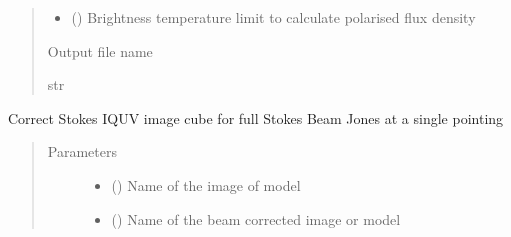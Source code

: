 \documentclass[letterpaper,10pt,english]{sphinxmanual}
\begin{document}
\begin{fulllineitems}
\begin{fulllineitems}
\begin{quote}
\begin{description}
\begin{itemize}
\item {} 
\sphinxAtStartPar
{} () \textendash{} Brightness temperature limit to calculate polarised flux density

\end{itemize}

\item[{Returns}] \leavevmode
\sphinxAtStartPar
Output file name

\item[{Return type}] \leavevmode
\sphinxAtStartPar
str

\end{description}\end{quote}

\end{fulllineitems}


\begin{fulllineitems}
\label{\detokenize{paircars:paircars.fullpol_selfcal_LTS.PolSelfcal.correct_for_single_beam_jones}}
\sphinxAtStartPar
Correct Stokes IQUV image cube for full Stokes Beam Jones at a single pointing
\begin{quote}\begin{description}
\item[{Parameters}] \leavevmode\begin{itemize}
\item {} 
\sphinxAtStartPar
{} () \textendash{} Name of the image of model

\item {} 
\sphinxAtStartPar
{} () \textendash{} Name of the beam corrected image or model


\end{itemize}
\end{description}
\end{quote}
\end{fulllineitems}
\end{fulllineitems}
\end{document}

